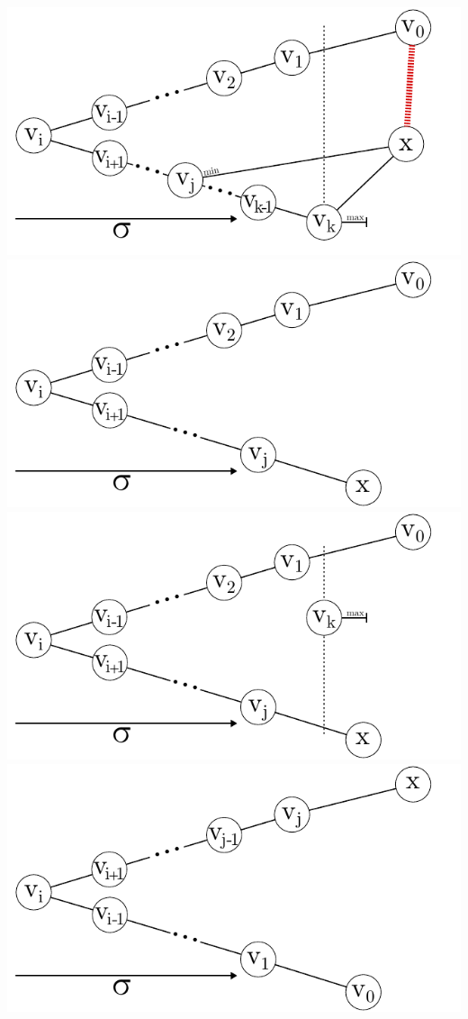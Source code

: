 \documentclass[xcolor=x11names,compress]{beamer}
\begin{document}
\begin{frame}
\begin{center}
\begin{overprint}
			\includegraphics[scale=1.0]{img/graph/q/01-07.pdf}
			\onslide<12>\includegraphics[scale=1.0]{img/graph/q/01-08.pdf}
			\onslide<13>\includegraphics[scale=1.0]{img/graph/q/01-09.pdf}
			\onslide<14>\includegraphics[scale=1.0]{img/graph/q/01-10.pdf}

\end{overprint}
\end{center}
\end{frame}
\end{document}
